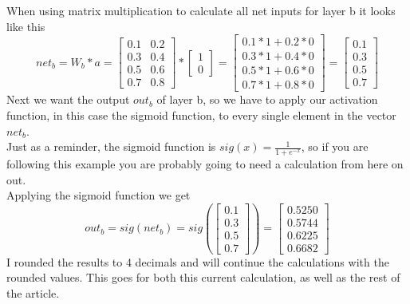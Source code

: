 \documentclass[11pt, halfparskip]{article}
\begin{document}
        When using matrix multiplication to calculate all net inputs for layer b it looks like this
        \[
           net_b = W_b * a =
        	\begin{bmatrix}
        	 	0.1 & 0.2\\
            	0.3 & 0.4\\
            	0.5 & 0.6\\
            	0.7 & 0.8
        	\end{bmatrix}
        	*
        	\begin{bmatrix}
        		1\\
        		0
        	\end{bmatrix}
        	=
        	\begin{bmatrix}
        		0.1 * 1 + 0.2 * 0\\
        		0.3 * 1 + 0.4 * 0\\
        		0.5 * 1 + 0.6 * 0\\
        		0.7 * 1 + 0.8 * 0
        	\end{bmatrix}
        	=
        	\begin{bmatrix}
        		0.1\\
        		0.3\\
        		0.5\\
        		0.7
        	\end{bmatrix}
        \]
        Next we want the output $out_b$ of layer b, so we have to apply our activation function, in this case the sigmoid function, to every single element in the vector $net_b$.\\
        Just as a reminder, the sigmoid function is $sig(x) = \frac{1}{1+ e^{-x}}$, so if you are following this example you are probably going to need a calculation from here on out.\\
        Applying the sigmoid function we get
        \[
        	out_b = sig(net_b) = sig(
        	   \begin{bmatrix}
	        	0.1\\
        		0.3\\
        		0.5\\
        		0.7
        	   \end{bmatrix}
        	) = 
        	\begin{bmatrix}
        		0.5250\\
        		0.5744\\
        		0.6225\\
        		0.6682
        	\end{bmatrix}
        \]
        I rounded the results to 4 decimals and will continue the calculations with the rounded values. This goes for both this current calculation, as well as the rest of the article.
        
\end{document}

